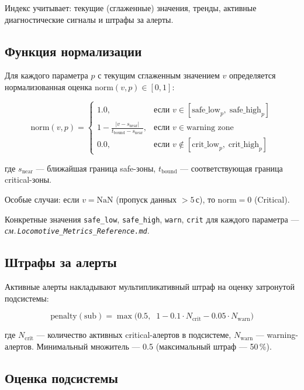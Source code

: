 \documentclass[12pt,a4paper]{article}
\newcommand{\code}[1]{\texttt{#1}}
\begin{document}
Индекс учитывает: текущие (сглаженные) значения, тренды, активные диагностические сигналы и штрафы за алерты.

\subsection{Функция нормализации}

Для каждого параметра $p$ с текущим сглаженным значением $v$ определяется нормализованная оценка $\mathrm{norm}(v, p) \in [0, 1]$:

\[
\mathrm{norm}(v, p) = \begin{cases}
  1.0, & \text{если } v \in [\text{safe\_low}_p,\; \text{safe\_high}_p] \\[6pt]
  \displaystyle 1 - \frac{|v - s_{\text{near}}|}{t_{\text{bound}} - s_{\text{near}}}, & \text{если } v \in \text{warning zone} \\[10pt]
  0.0, & \text{если } v \notin [\text{crit\_low}_p,\; \text{crit\_high}_p]
\end{cases}
\]

где $s_{\text{near}}$ --- ближайшая граница safe-зоны, $t_{\text{bound}}$ --- соответствующая граница critical-зоны.

Особые случаи: если $v = \mathrm{NaN}$ (пропуск данных $> 5$\,с), то $\mathrm{norm} = 0$ (Critical).

Конкретные значения \code{safe\_low}, \code{safe\_high}, \code{warn}, \code{crit} для каждого параметра --- \textit{см.\,\code{Locomotive\_Metrics\_Reference.md}}.

\subsection{Штрафы за алерты}
\label{sec:alert-penalty}

Активные алерты накладывают мультипликативный штраф на оценку затронутой подсистемы:

\[
\mathrm{penalty}(\text{sub}) = \max\!\Big(0.5,\;\; 1 - 0.1 \cdot N_{\text{crit}} - 0.05 \cdot N_{\text{warn}}\Big)
\]

где $N_{\text{crit}}$ --- количество активных critical-алертов в подсистеме, $N_{\text{warn}}$ --- warning-алертов. Минимальный множитель --- 0.5 (максимальный штраф --- 50\,\%).

\subsection{Оценка подсистемы}
\end{document}
